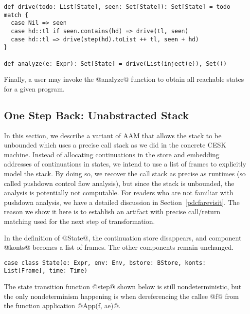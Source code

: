 \documentclass[acmsmall,review,anonymous]{acmart}\settopmatter{printfolios=true,printccs=false,printacmref=false}
\begin{document}
\begin{lstlisting}
def drive(todo: List[State], seen: Set[State]): Set[State] = todo match {
  case Nil => seen
  case hd::tl if seen.contains(hd) => drive(tl, seen)
  case hd::tl => drive(step(hd).toList ++ tl, seen + hd)
}

def analyze(e: Expr): Set[State] = drive(List(inject(e)), Set())
\end{lstlisting}

Finally, a user may invoke the @analyze@ function to obtain all reachable states for a given
program.


\subsection{One Step Back: Unabstracted Stack}

In this section, we describe a variant of AAM that allows the stack to be
unbounded which uses a precise call stack as we did in the concrete CESK machine.
Instead of allocating continuations in the store and embedding
addresses of continuations in states, we intend to use a list of frames
to explicitly model the stack.
By doing so, we recover the call stack as precise as runtimes
(so called pushdown control flow analysis), but since
the stack is unbounded, the analysis is potentially not computable.
For readers who are not familiar with pushdown analysis, we have a detailed
discussion in Section~\ref{pdcfarevisit}.
The reason we show it here is to establish an artifact with precise call/return matching
used for the next step of transformation.

In the definition of @State@, the continuation store disappears, and
component @konts@ becomes a list of frames. The other components remain unchanged.

\begin{lstlisting}
case class State(e: Expr, env: Env, bstore: BStore, konts: List[Frame], time: Time)
\end{lstlisting}

The state transition function @step@ shown below is still
nondeterministic, but the only nondeterminism happening is when dereferencing the callee @f@
from the function application @App(f, ae)@.
\end{document}
